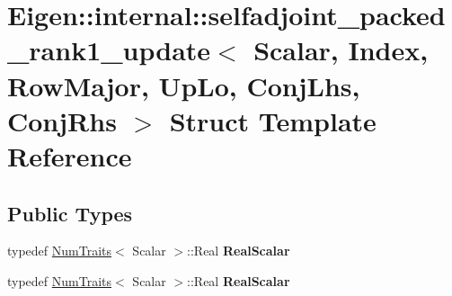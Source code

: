 \hypertarget{struct_eigen_1_1internal_1_1selfadjoint__packed__rank1__update_3_01_scalar_00_01_index_00_01_row44ee905dfbb7f4c0a9e13e624ea4a89c}{}\section{Eigen\+:\+:internal\+:\+:selfadjoint\+\_\+packed\+\_\+rank1\+\_\+update$<$ Scalar, Index, Row\+Major, Up\+Lo, Conj\+Lhs, Conj\+Rhs $>$ Struct Template Reference}
\label{struct_eigen_1_1internal_1_1selfadjoint__packed__rank1__update_3_01_scalar_00_01_index_00_01_row44ee905dfbb7f4c0a9e13e624ea4a89c}
\subsection*{Public Types}
\begin{DoxyCompactItemize}
\item 
\mbox{\label{struct_eigen_1_1internal_1_1selfadjoint__packed__rank1__update_3_01_scalar_00_01_index_00_01_row44ee905dfbb7f4c0a9e13e624ea4a89c_ab41122e800b8ca937729d8d0420f9877}} 
typedef \hyperlink{group___core___module_struct_eigen_1_1_num_traits}{Num\+Traits}$<$ Scalar $>$\+::Real {\bfseries Real\+Scalar}
\item 
\mbox{\label{struct_eigen_1_1internal_1_1selfadjoint__packed__rank1__update_3_01_scalar_00_01_index_00_01_row44ee905dfbb7f4c0a9e13e624ea4a89c_ab41122e800b8ca937729d8d0420f9877}} 
typedef \hyperlink{group___core___module_struct_eigen_1_1_num_traits}{Num\+Traits}$<$ Scalar $>$\+::Real {\bfseries Real\+Scalar}
\end{DoxyCompactItemize}

